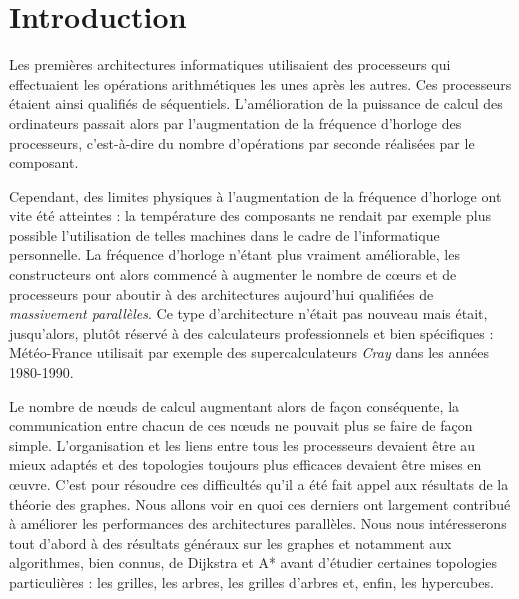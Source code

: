 \section*{Introduction}

Les premières architectures informatiques utilisaient des processeurs qui effectuaient les opérations arithmétiques les unes après les autres. Ces processeurs étaient ainsi qualifiés de séquentiels. L'amélioration de la puissance de calcul des ordinateurs passait alors par l'augmentation de la fréquence d'horloge des processeurs, c'est-à-dire du nombre d'opérations par seconde réalisées par le composant.

Cependant, des limites physiques à l'augmentation de la fréquence d'horloge ont vite été atteintes : la température des composants ne rendait par exemple plus possible l'utilisation de telles machines dans le cadre de l'informatique personnelle. La fréquence d'horloge n'étant plus vraiment améliorable, les constructeurs ont alors commencé à augmenter le nombre de cœurs et de processeurs pour aboutir à des architectures aujourd'hui qualifiées de \textit{massivement parallèles}. Ce type d'architecture n'était pas nouveau mais était, jusqu'alors, plutôt réservé à des calculateurs professionnels et bien spécifiques : Météo-France utilisait par exemple des supercalculateurs \textit{Cray} dans les années 1980-1990.

Le nombre de nœuds de calcul augmentant alors de façon conséquente, la communication entre chacun de ces nœuds ne pouvait plus se faire de façon simple. L'organisation et les liens entre tous les processeurs devaient être au mieux adaptés et des topologies toujours plus efficaces devaient être mises en œuvre. C'est pour résoudre ces difficultés qu'il a été fait appel aux résultats de la théorie des graphes. Nous allons voir en quoi ces derniers ont largement contribué à améliorer les performances des architectures parallèles. Nous nous intéresserons tout d'abord à des résultats généraux sur les graphes et notamment aux algorithmes, bien connus, de Dijkstra et A* avant d'étudier certaines topologies particulières : les grilles, les arbres, les grilles d'arbres et, enfin, les hypercubes.